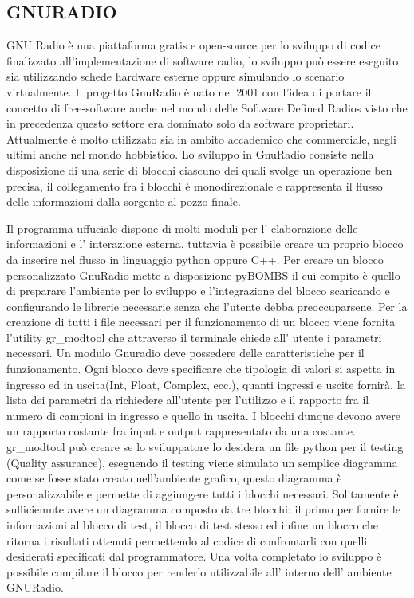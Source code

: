 \begin{itemize}
\chapter{GNURADIO}
GNU Radio è una piattaforma gratis e open-source per lo sviluppo di codice finalizzato all'implementazione di software radio, lo sviluppo può essere eseguito sia utilizzando schede hardware esterne oppure simulando lo scenario virtualmente. Il progetto GnuRadio è nato nel 2001 con l'idea di portare il concetto di free-software anche nel mondo delle Software Defined Radios visto che in precedenza questo settore era dominato solo da software proprietari. Attualmente è molto utilizzato sia in ambito accademico che commerciale, negli ultimi anche nel mondo hobbistico. Lo sviluppo in GnuRadio consiste nella disposizione di una serie di blocchi ciascuno dei quali svolge un operazione ben precisa, il collegamento fra i blocchi è monodirezionale e rappresenta il flusso delle informazioni dalla sorgente al pozzo finale.

 Il programma uffuciale dispone di molti moduli per l' elaborazione delle informazioni e l' interazione esterna, tuttavia è possibile creare un proprio blocco da inserire nel flusso in linguaggio python oppure C++. Per creare un blocco personalizzato GnuRadio mette a disposizione pyBOMBS il cui compito è quello di preparare l'ambiente per lo sviluppo e l'integrazione del blocco scaricando e configurando le librerie necessarie senza che l'utente debba preoccuparsene.
 Per la creazione di tutti i file necessari per il funzionamento di un blocco viene fornita l'utility gr\_modtool che attraverso il terminale chiede all' utente i parametri necessari. Un modulo Gnuradio deve possedere delle caratteristiche per il funzionamento. Ogni blocco deve specificare che tipologia di valori si aspetta in ingresso ed in uscita(Int, Float, Complex, ecc.), quanti ingressi e uscite fornirà, la lista dei parametri da richiedere all'utente per l'utilizzo e il rapporto fra il numero di campioni in ingresso e quello in uscita. I blocchi dunque devono avere un rapporto costante fra input e output rappresentato da una costante. gr\_modtool può creare se lo sviluppatore lo desidera un file python per il testing (Quality assurance), eseguendo il testing viene simulato un semplice diagramma come se fosse stato creato nell'ambiente grafico, questo diagramma è personalizzabile e permette di aggiungere tutti i blocchi necessari. Solitamente è sufficiemnte avere un diagramma composto da tre blocchi: il primo per fornire le informazioni al blocco di test, il blocco di test stesso ed infine un blocco che ritorna i risultati ottenuti permettendo al codice di confrontarli con quelli desiderati specificati dal programmatore.
 Una volta completato lo sviluppo è possibile compilare il blocco per renderlo utilizzabile all' interno dell' ambiente GNURadio.


\end{itemize}
